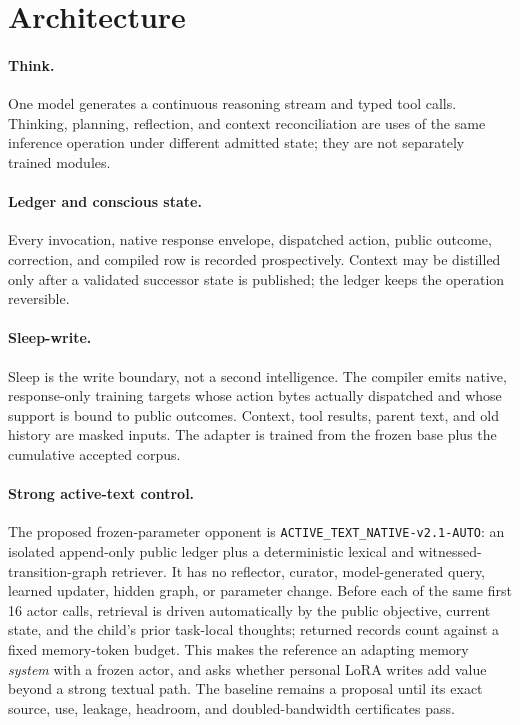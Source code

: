\documentclass{article}
\begin{document}
\section{Architecture}

\paragraph{Think.}
One model generates a continuous reasoning stream and typed tool calls.
Thinking, planning, reflection, and context reconciliation are uses of the
same inference operation under different admitted state; they are not
separately trained modules.

\paragraph{Ledger and conscious state.}
Every invocation, native response envelope, dispatched action, public
outcome, correction, and compiled row is recorded prospectively. Context may
be distilled only after a validated successor state is published; the ledger
keeps the operation reversible.

\paragraph{Sleep-write.}
Sleep is the write boundary, not a second intelligence. The compiler emits
native, response-only training targets whose action bytes actually dispatched
and whose support is bound to public outcomes. Context, tool results, parent
text, and old history are masked inputs. The adapter is trained from the
frozen base plus the cumulative accepted corpus.

\paragraph{Strong active-text control.}
The proposed frozen-parameter opponent is
\texttt{ACTIVE\_TEXT\_NATIVE-v2.1-AUTO}: an isolated append-only public ledger
plus a deterministic lexical and witnessed-transition-graph retriever. It has
no reflector, curator, model-generated query, learned updater, hidden graph,
or parameter change. Before each of the same first 16 actor calls, retrieval
is driven automatically by the public objective, current state, and the
child's prior task-local thoughts; returned records count against a fixed
memory-token budget. This makes the reference an adapting memory \emph{system}
with a frozen actor, and asks whether personal LoRA writes add value beyond a
strong textual path. The baseline remains a proposal until its exact source,
use, leakage, headroom, and doubled-bandwidth certificates pass.
\end{document}
